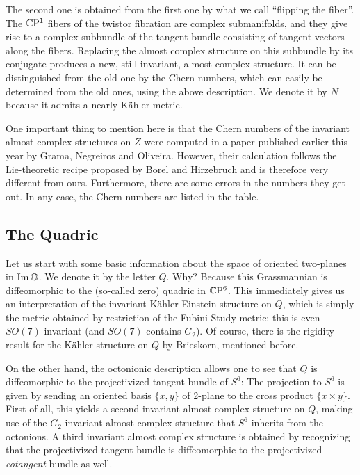 \documentclass[parskip=half]{scrartcl}
\begin{document}
The second one is obtained from the first one by what we call ``flipping the fiber''. The $\mathbb{C}\mathrm{P}^1$ fibers of the twistor fibration are complex submanifolds, and they give rise to a complex subbundle of the tangent bundle consisting of tangent vectors along the fibers. Replacing the almost complex structure on this subbundle by its conjugate produces a new, still invariant, almost complex structure. It can be distinguished from the old one by the Chern numbers, which can easily be determined from the old ones, using the above description. We denote it by $N$ because it admits a nearly K\"ahler metric. 

One important thing to mention here is that the Chern numbers of the invariant almost complex structures on $Z$ were computed in a paper published earlier this year by Grama, Negreiros and Oliveira. However, their calculation follows the Lie-theoretic recipe proposed by Borel and Hirzebruch and is therefore very different from ours. Furthermore, there are some errors in the numbers they get out. In any case, the Chern numbers are listed in the table. 

\subsection{The Quadric}

Let us start with some basic information about the space of oriented two-planes in $\operatorname{Im}\mathbb{O}$. We denote it by the letter $Q$. Why? Because this Grassmannian is diffeomorphic to the (so-called zero) quadric in $\mathbb{C}\mathrm{P}^6$. This immediately gives us an interpretation of the invariant K\"ahler-Einstein structure on $Q$, which is simply the metric obtained by restriction of the Fubini-Study metric; this is even $SO(7)$-invariant (and $SO(7)$ contains $G_2$). Of course, there is the rigidity result for the K\"ahler structure on $Q$ by Brieskorn, mentioned before.

On the other hand, the octonionic description allows one to see that $Q$ is diffeomorphic to the projectivized tangent bundle of $S^6$: The projection to $S^6$ is given by sending an oriented basis $\{x,y\}$ of 2-plane to the cross product $\{x\times y\}$. First of all, this yields a second invariant almost complex structure on $Q$, making use of the $G_2$-invariant almost complex structure that $S^6$ inherits from the octonions. A third invariant almost complex structure is obtained by recognizing that the projectivized tangent bundle is diffeomorphic to the projectivized \emph{cotangent} bundle as well. 
\end{document}
